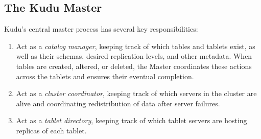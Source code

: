 \documentclass{vldb}
\begin{document}

\subsection{The Kudu Master}

Kudu's central master process has several key responsibilities:
\begin{enumerate}
\item Act as a {\em catalog manager}, keeping track of which tables and tablets exist, as
well as their schemas, desired replication levels, and other metadata. When tables are created,
altered, or deleted, the Master coordinates these actions across the tablets and ensures
their eventual completion.
\item Act as a {\em cluster coordinator}, keeping track of which servers in the cluster
are alive and coordinating redistribution of data after server failures.
\item Act as a {\em tablet directory}, keeping track of which tablet servers are
hosting replicas of each tablet.
\end{enumerate}
\end{document}
